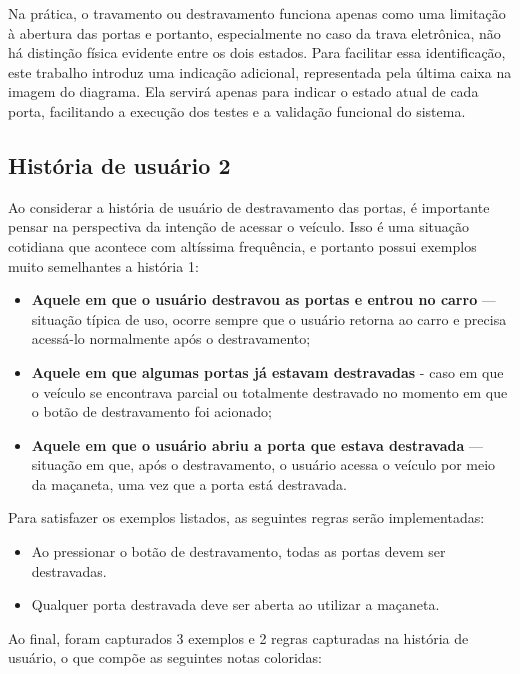 Na prática, o travamento ou destravamento funciona apenas como uma limitação à abertura das portas e portanto, especialmente no caso da trava eletrônica, 
não há distinção física evidente entre os dois estados. Para facilitar essa identificação, este trabalho introduz uma indicação adicional, representada 
pela última caixa na imagem do diagrama. Ela servirá apenas para indicar o estado atual de cada porta, facilitando a execução dos testes e a validação 
funcional do sistema.

\subsection{História de usuário 2}

Ao considerar a história de usuário de destravamento das portas, é importante pensar na perspectiva da intenção de acessar o veículo. Isso é uma situação 
cotidiana que acontece com altíssima frequência, e portanto possui exemplos muito semelhantes a história 1:

\begin{itemize}
    \item \textbf{Aquele em que o usuário destravou as portas e entrou no carro} — situação típica de uso, ocorre sempre que o usuário retorna ao carro e precisa acessá-lo normalmente após o destravamento;
    \item \textbf{Aquele em que algumas portas já estavam destravadas} - caso em que o veículo se encontrava parcial ou totalmente destravado no momento em que o botão de destravamento foi acionado;
    \item \textbf{Aquele em que o usuário abriu a porta que estava destravada} —  situação em que, após o destravamento, o usuário acessa o veículo por meio da maçaneta, uma vez que a porta está destravada.
\end{itemize}

Para satisfazer os exemplos listados, as seguintes regras serão implementadas:

\begin{itemize}
    \item Ao pressionar o botão de destravamento, todas as portas devem ser destravadas.
    \item Qualquer porta destravada deve ser aberta ao utilizar a maçaneta.
\end{itemize}

Ao final, foram capturados 3 exemplos e 2 regras capturadas na história de usuário, o que compõe as seguintes notas coloridas:

